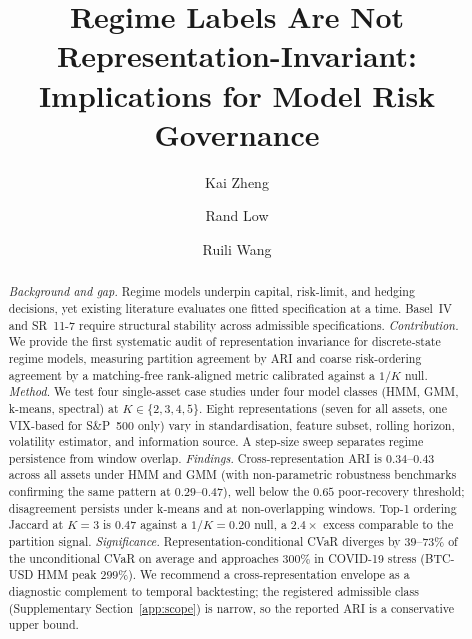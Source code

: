 \documentclass[preprint,12pt,authoryear]{elsarticle}
\def\corref#1{}%
\begin{document}
\begin{frontmatter}
\sloppy

\title{Regime Labels Are Not Representation-Invariant:\\ Implications for Model Risk Governance}

\author[1]{Kai Zheng}
\author[2]{Rand Low}
\author[1]{Ruili Wang\corref{cor1}}




\begin{abstract}
\textit{Background and gap.} Regime models underpin capital, risk-limit, and hedging decisions, yet existing literature evaluates one fitted specification at a time. Basel~IV and SR~11-7 require structural stability across admissible specifications.
\textit{Contribution.} We provide the first systematic audit of representation invariance for discrete-state regime models, measuring partition agreement by ARI and coarse risk-ordering agreement by a matching-free rank-aligned metric calibrated against a $1/K$ null.
\textit{Method.} We test four single-asset case studies under four model classes (HMM, GMM, k-means, spectral) at $K\in\{2,3,4,5\}$. Eight representations (seven for all assets, one VIX-based for S\&P~500 only) vary in standardisation, feature subset, rolling horizon, volatility estimator, and information source. A step-size sweep separates regime persistence from window overlap.
\textit{Findings.} Cross-representation ARI is $0.34$--$0.43$ across all assets under HMM and GMM (with non-parametric robustness benchmarks confirming the same pattern at $0.29$--$0.47$), well below the $0.65$ poor-recovery threshold; disagreement persists under k-means and at non-overlapping windows. Top-1 ordering Jaccard at $K=3$ is $0.47$ against a $1/K=0.20$ null, a $2.4\times$ excess comparable to the partition signal.
\textit{Significance.} Representation-conditional CVaR diverges by $39$--$73\%$ of the unconditional CVaR on average and approaches $300\%$ in COVID-19 stress (BTC-USD HMM peak $299\%$). We recommend a cross-representation envelope as a diagnostic complement to temporal backtesting; the registered admissible class (Supplementary Section~\ref{app:scope}) is narrow, so the reported ARI is a conservative upper bound.
\end{abstract}


\end{frontmatter}
\end{document}
